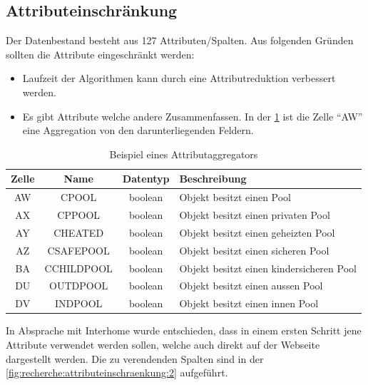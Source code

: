 \subsection{Attributeinschränkung}
\label{sec:recherche:attributeinschraenkung}
Der Datenbestand besteht aus 127 Attributen/Spalten. Aus folgenden Gründen sollten die Attribute eingeschränkt werden:
\begin{itemize}
\item Laufzeit der Algorithmen kann durch eine Attributreduktion verbessert werden.
\item Es gibt Attribute welche andere Zusammenfassen. In der \cref{fig:recherche:attributeinschraenkung:1} ist die Zelle "`AW"' eine Aggregation von den darunterliegenden Feldern.
\end{itemize}

\begin{table}[H] 
	\caption{Beispiel eines Attributaggregators}
	\centering
		\label{fig:recherche:attributeinschraenkung:1}
	\begin{tabular}{ | c | c | c | l |} 
		\hline 
		\rowcolor{tableheadcolor}
		\bfseries Zelle & \bfseries Name & \bfseries Datentyp & \bfseries Beschreibung \\ \hline 
		AW & CPOOL & boolean & Objekt besitzt einen Pool \\ \hline 
		AX & CPPOOL & boolean & Objekt besitzt einen privaten Pool \\ \hline 
		AY & CHEATED & boolean & Objekt besitzt einen geheizten Pool \\ \hline 
		AZ & CSAFEPOOL & boolean & Objekt besitzt einen sicheren Pool \\ \hline 
		BA & CCHILDPOOL & boolean & Objekt besitzt einen kindersicheren Pool \\ \hline 
		DU & OUTDPOOL & boolean & Objekt besitzt einen aussen Pool \\ \hline 
		DV & INDPOOL & boolean & Objekt besitzt einen innen Pool \\ \hline 
	\end{tabular}
\end{table}

In Absprache mit Interhome wurde entschieden, dass in einem ersten Schritt jene Attribute verwendet werden sollen, welche auch direkt auf der Webseite dargestellt werden. Die zu verendenden Spalten sind in der \cref{fig:recherche:attributeinschraenkung:2} aufgeführt.

